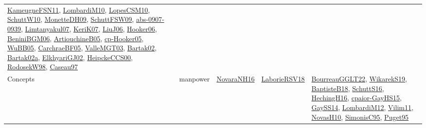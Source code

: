 {\begin{longtable}{lp{3cm}>{\raggedright}p{6cm}>{\raggedright}p{6cm}p{8cm}}
\href{papers/KameugneFSN11.pdf}{KameugneFSN11}\cite{KameugneFSN11}, \href{papers/LombardiM10.pdf}{LombardiM10}\cite{LombardiM10}, \href{articles/LopesCSM10.pdf}{LopesCSM10}\cite{LopesCSM10}, \href{papers/SchuttW10.pdf}{SchuttW10}\cite{SchuttW10}, \href{papers/MonetteDH09.pdf}{MonetteDH09}\cite{MonetteDH09}, \href{papers/SchuttFSW09.pdf}{SchuttFSW09}\cite{SchuttFSW09}, \href{articles/abs-0907-0939.pdf}{abs-0907-0939}\cite{abs-0907-0939}, \href{papers/Limtanyakul07.pdf}{Limtanyakul07}\cite{Limtanyakul07}, \href{papers/KeriK07.pdf}{KeriK07}\cite{KeriK07}, \href{papers/LiuJ06.pdf}{LiuJ06}\cite{LiuJ06}, \href{articles/Hooker06.pdf}{Hooker06}\cite{Hooker06}, \href{papers/BeniniBGM06.pdf}{BeniniBGM06}\cite{BeniniBGM06}, \href{papers/ArtiouchineB05.pdf}{ArtiouchineB05}\cite{ArtiouchineB05}, \href{papers/cp-Hooker05.pdf}{cp-Hooker05}\cite{cp-Hooker05}, \href{papers/WuBB05.pdf}{WuBB05}\cite{WuBB05}, \href{papers/CarchraeBF05.pdf}{CarchraeBF05}\cite{CarchraeBF05}, \href{papers/ValleMGT03.pdf}{ValleMGT03}\cite{ValleMGT03}, \href{papers/Bartak02.pdf}{Bartak02}\cite{Bartak02}, \href{papers/Bartak02a.pdf}{Bartak02a}\cite{Bartak02a}, \href{papers/ElkhyariGJ02.pdf}{ElkhyariGJ02}\cite{ElkhyariGJ02}, \href{articles/HeipckeCCS00.pdf}{HeipckeCCS00}\cite{HeipckeCCS00}, \href{papers/RodosekW98.pdf}{RodosekW98}\cite{RodosekW98}, \href{papers/Caseau97.pdf}{Caseau97}\cite{Caseau97}\\
Concepts & manpower & \href{articles/NovaraNH16.pdf}{NovaraNH16}\cite{NovaraNH16} & \href{articles/LaborieRSV18.pdf}{LaborieRSV18}\cite{LaborieRSV18} & \href{articles/BourreauGGLT22.pdf}{BourreauGGLT22}\cite{BourreauGGLT22}, \href{articles/WikarekS19.pdf}{WikarekS19}\cite{WikarekS19}, \href{articles/BaptisteB18.pdf}{BaptisteB18}\cite{BaptisteB18}, \href{papers/SchuttS16.pdf}{SchuttS16}\cite{SchuttS16}, \href{papers/HechingH16.pdf}{HechingH16}\cite{HechingH16}, \href{papers/cpaior-GayHS15.pdf}{cpaior-GayHS15}\cite{cpaior-GayHS15}, \href{papers/GaySS14.pdf}{GaySS14}\cite{GaySS14}, \href{articles/LombardiM12.pdf}{LombardiM12}\cite{LombardiM12}, \href{papers/Vilim11.pdf}{Vilim11}\cite{Vilim11}, \href{articles/NovasH10.pdf}{NovasH10}\cite{NovasH10}, \href{papers/SimonisC95.pdf}{SimonisC95}\cite{SimonisC95}, \href{papers/Puget95.pdf}{Puget95}\cite{Puget95}\\

\end{longtable}}

